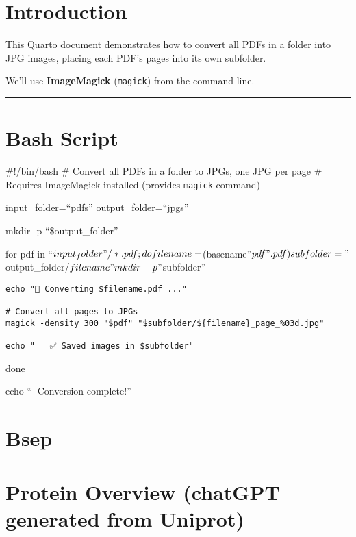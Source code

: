 \documentclass[
  letterpaper,
  DIV=11,
  numbers=noendperiod]{scrreprt}
\begin{document}

\chapter{Introduction}\label{introduction-1}

This Quarto document demonstrates how to convert all PDFs in a folder
into JPG images, placing each PDF's pages into its own subfolder.

We'll use \textbf{ImageMagick} (\texttt{magick}) from the command line.

\begin{center}\rule{0.5\linewidth}{0.5pt}\end{center}


\chapter{Bash Script}\label{bash-script}

\#!/bin/bash \# Convert all PDFs in a folder to JPGs, one JPG per page
\# Requires ImageMagick installed (provides \texttt{magick} command)

input\_folder=``pdfs'' output\_folder=``jpgs''

mkdir -p ``\$output\_folder''

for pdf in ``\(input_folder"/*.pdf; do
    filename=\)(basename''\(pdf" .pdf)
    subfolder="\)output\_folder/\(filename"
    mkdir -p "\)subfolder''

\begin{verbatim}
echo "📄 Converting $filename.pdf ..."

# Convert all pages to JPGs
magick -density 300 "$pdf" "$subfolder/${filename}_page_%03d.jpg"

echo "   ✅ Saved images in $subfolder"
\end{verbatim}

done

echo ``🎉 Conversion complete!''


\chapter{Bsep}\label{bsep}


\chapter{Protein Overview (chatGPT generated from
Uniprot)}\label{protein-overview-chatgpt-generated-from-uniprot}
\end{document}
